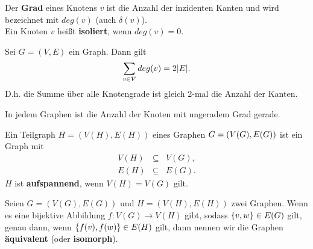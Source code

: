 	\begin{definition*}[Knotengrad]
		Der \textbf{Grad} eines Knotens $v$ ist die Anzahl der inzidenten Kanten und wird bezeichnet mit $deg(v)$ (auch $\delta(v)$).\\[5pt]
		Ein Knoten $v$ heißt \textbf{isoliert}, wenn $deg(v) = 0$.
	\end{definition*}
	\begin{satz}
		Sei $G = (V, E)$ ein Graph. Dann gilt
		\begin{equation*}
			\sum_{v \in V} deg(v) = 2\vert E \vert.
		\end{equation*}
		D.h. die Summe über alle Knotengrade ist gleich 2-mal die Anzahl der Kanten.
	\end{satz}
	\begin{lemma}
		In jedem Graphen ist die Anzahl der Knoten mit ungeradem Grad gerade.
	\end{lemma}
	\begin{definition*}[Teilgraph]
		Ein Teilgraph $H = (V(H), E(H))$ eines Graphen $G =\\ (V(G), E(G))$ ist ein Graph mit
		\begin{eqnarray*}
			V(H) &\subseteq& V(G),\\
			E(H) &\subseteq& E(G).
		\end{eqnarray*}
		$H$ ist \textbf{aufspannend}, wenn $V(H) = V(G)$ gilt.
	\end{definition*}
	\begin{definition*}[Isomorph]
		Seien $G = (V(G), E(G))$ und $H = (V(H), E(H))$ zwei Graphen. Wenn es eine bijektive Abbildung $f : V(G) \to V(H)$ gibt, sodass $\{v, w\} \in E(G)$ gilt, genau dann, wenn $\{f(v), f(w)\} \in E(H)$ gilt, dann nennen wir die Graphen \textbf{äquivalent} (oder \textbf{isomorph}).
	\end{definition*}
	

